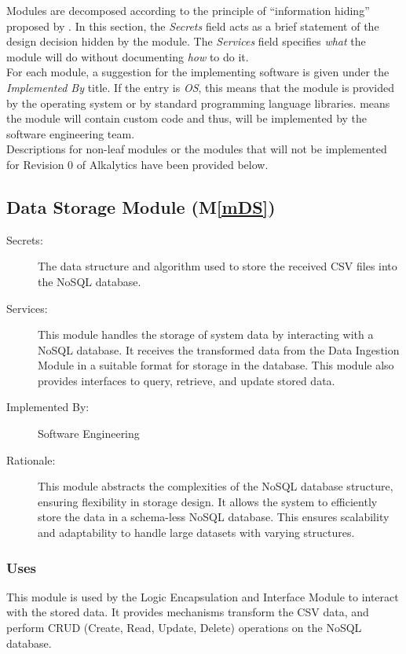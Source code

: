 \documentclass[12pt, titlepage]{article}
\newcommand{\mref}[1]{M\ref{#1}}
\begin{document}
Modules are decomposed according to the principle of ``information hiding''
proposed by \citet{ParnasEtAl1984}. In this section, the \emph{Secrets} field acts as a brief
statement of the design decision hidden by the module. The \emph{Services} field specifies
\emph{what} the module will do without documenting \emph{how} to do it.\\
\newline
For each module, a suggestion for the implementing software is given under the 
\emph{Implemented By} title. If the entry is \emph{OS}, this means that the module is
provided by the operating system or by standard programming language libraries.
\emph{\progname{}} means the module will contain custom code and thus, will be implemented
by the software engineering team.\\
\newline
Descriptions for non-leaf modules or the modules that will not be implemented for Revision 0 of
Alkalytics have been provided below.

\subsection{Data Storage Module (\mref{mDS})}
\begin{description}
  \item[Secrets:] The data structure and algorithm used to store the received CSV files into the
  NoSQL database.
  \item[Services:] This module handles the storage of system data by interacting with
  a NoSQL database. It receives the transformed data from the Data Ingestion Module in a suitable
  format for storage in the database. This module also provides interfaces to query, retrieve, and
  update stored data.
  \item[Implemented By:] Software Engineering
  \item[Rationale:] This module abstracts the complexities of the NoSQL database
  structure, ensuring flexibility in storage design. It allows the system to 
  efficiently store the data in a schema-less NoSQL database. This ensures scalability and 
  adaptability to handle large datasets with varying structures.
\end{description}

\subsubsection{Uses}
This module is used by the Logic Encapsulation and Interface Module to interact
with the stored data. It provides mechanisms transform the CSV data, and
perform CRUD (Create, Read, Update, Delete) operations on the NoSQL database.
\end{document}
